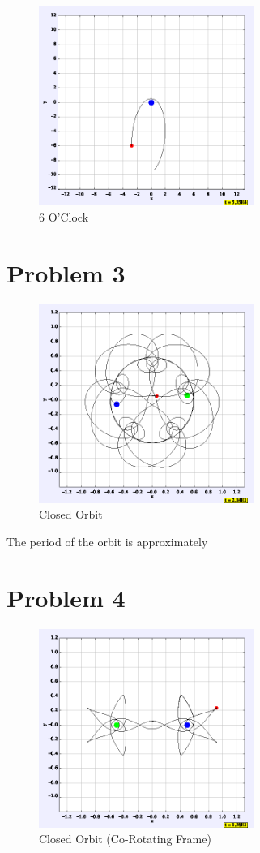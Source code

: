 \documentclass[pra,superscriptaddress,reprint,showpacs]{revtex4-1}
\begin{document}
\begin{figure}[H]
    \centering 
    \caption{6 O'Clock}
    \includegraphics[width=7cm]{6oclock.png}
\end{figure}

\section{Problem 3}

\begin{figure}[H]
    \centering 
    \caption{Closed Orbit}
    \includegraphics[width=7cm]{3.png}
\end{figure}

The period of the orbit is approximately 

\section{Problem 4}

\begin{figure}[h!]
    \centering 
    \caption{Closed Orbit (Co-Rotating Frame)}
    \includegraphics[width=7cm]{corot.png}
\end{figure}
\end{document}
